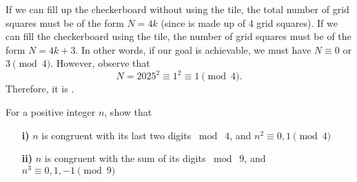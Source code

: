 \begin{solution}
    If we can fill up the checkerboard without using the  tile, the total number of grid squares must be of the form $N=4k$ (since  is made up of 4 grid squares). If we can fill the checkerboard using the  tile, the number of grid squares must be of the form $N=4k+3$. In other words, if our goal is achievable, we must have $N\equiv0$ or $3 \pmod 4$. However, observe that
    \[
        N=2025^2 \equiv 1^2 \equiv 1 \pmod 4.
    \]
    Therefore, it is .
\end{solution}

\begin{problem}
    For a positive integer $n$, show that 
    \begin{itemize}
        \item[\textbf{i)}] $n$ is congruent with its last two digits $\bmod\;4$, and $n^2 \equiv 0,1 \pmod 4$  
        \item[\textbf{ii)}] $n$ is congruent with the sum of its digits $\bmod\;9$, and $n^3 \equiv 0,1,-1 \pmod 9$
    \end{itemize}
\end{problem}

